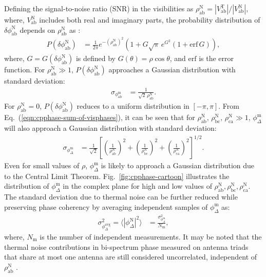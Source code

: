 \documentclass[
reprint,
superscriptaddress,
amsmath,
amssymb,
aps,
prd
]{revtex4-1}
\begin{document}
Defining the signal-to-noise ratio (SNR) in the visibilities as $\rho_\textrm{ab}^\textrm{N} = |V_\textrm{ab}^\textrm{T}|/|V_\textrm{ab}^\textrm{N}|$, where, $V_\textrm{ab}^\textrm{N}$ includes both real and imaginary parts, the probability distribution of $\delta\phi_\textrm{ab}^\textrm{N}$ depends on $\rho_\textrm{ab}^\textrm{N}$ as \cite{cra89}:
\begin{align}
  P(\delta\phi_\textrm{ab}^\textrm{N}) &= \frac{1}{2\pi} e^{-(\rho_\textrm{ab}^\textrm{N})^2} \left(1 + G\sqrt{\pi}\,e^{G^2}(1+\mathrm{erf}\,G)\right),
\end{align}
where, $G=G(\delta\phi_\textrm{ab}^\textrm{N})$ is defined by $G(\theta)=\rho\cos\theta$, and $\mathrm{erf}$ is the error function. For $\rho_\textrm{ab}^\textrm{N}\gg 1$, $P(\delta\phi_\textrm{ab}^\textrm{N})$ approaches a Gaussian distribution with standard deviation:
\begin{align}
  \sigma_{\phi_\textrm{ab}^\textrm{m}} &= \frac{1}{\sqrt{2}\,\rho_\textrm{ab}^\textrm{N}}.
\end{align}
For $\rho_\textrm{ab}^\textrm{N}=0$, $P(\delta\phi_\textrm{ab}^\textrm{N})$ reduces to a uniform distribution in $[-\pi,\pi]$. From Eq.~(\ref{eqn:cpphase-sum-of-visphases}), it can be seen that for $\rho_\textrm{ab}^\textrm{N},\,\rho_\textrm{bc}^\textrm{N},\,\rho_\textrm{ca}^\textrm{N}\gg 1$, $\phi_\Delta^\textrm{m}$ will also approach a Gaussian distribution with standard deviation:
\begin{align}
  \sigma_{\phi_\Delta^\textrm{m}} &= \frac{1}{\sqrt{2}}\left[\left(\frac{1}{\rho_\textrm{ab}^\textrm{N}}\right)^2 + \left(\frac{1}{\rho_\textrm{bc}^\textrm{N}}\right)^2 + \left(\frac{1}{\rho_\textrm{ca}^\textrm{N}}\right)^2\right]^{1/2}. \label{eqn:cprms-noise}
\end{align}
Even for small values of $\rho$, $\phi_\Delta^\textrm{m}$ is likely to approach a Gaussian distribution due to the Central Limit Theorem. Fig.~\ref{fig:cpphase-cartoon} illustrates the distribution of $\phi_\Delta^\textrm{m}$ in the complex plane for high and low values of $\rho_\textrm{ab}^\textrm{N},\rho_\textrm{bc}^\textrm{N},\rho_\textrm{ca}^\textrm{N}$. The standard deviation due to thermal noise can be further reduced while preserving phase coherency by averaging independent samples of $\phi_\Delta^\textrm{m}$ as:
\begin{align}
  \sigma_{\phi_\Delta^\textrm{avg}}^2 = \bigg\langle |\phi_\Delta^\textrm{N}|^2\bigg\rangle &= \frac{\sigma_{\phi_\Delta^\textrm{m}}^2}{N_\textrm{m}},
\end{align}
where, $N_\textrm{m}$ is the number of independent measurements. It may be noted that the thermal noise contributions in bi-spectrum phase measured on antenna triads that share at most one antenna are still considered uncorrelated, independent of $\rho_\textrm{ab}^\textrm{N}$ \cite{kul89}.
\end{document}
